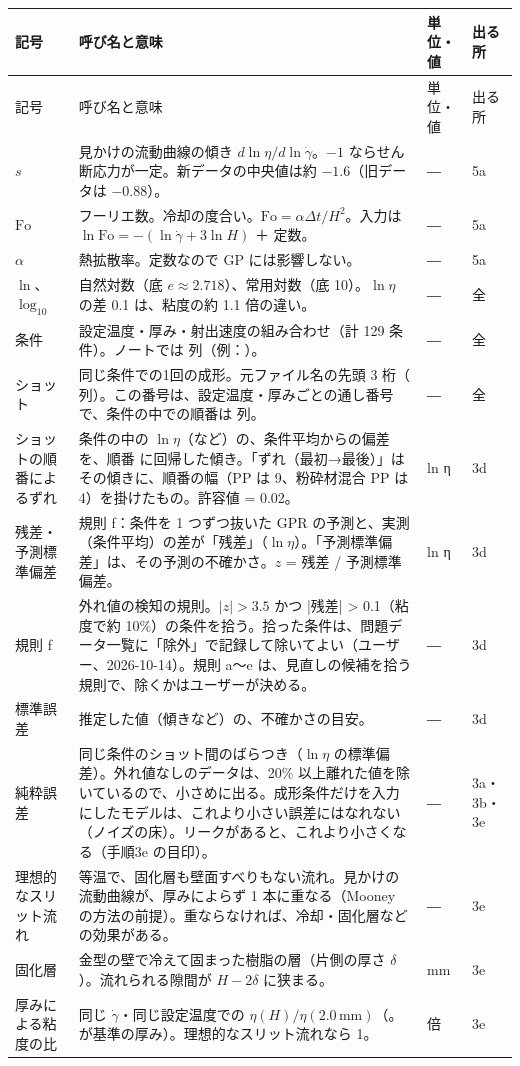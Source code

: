 \documentclass[paper=a4paper,fontsize=10.5pt,line_length=44zw,number_of_lines=38]{jlreq}
\makeatletter
\newcommand{\file}[1]{\texttt{\detokenize{#1}}}
\newcommand{\gd}{\dot{\gamma}}
\newenvironment{symtab}{%
  \begin{longtable}{@{}>{\raggedright\arraybackslash}p{6.5\zw}>{\raggedright\arraybackslash}p{22\zw}>{\raggedright\arraybackslash}p{6\zw}>{\raggedright\arraybackslash}p{4.5\zw}@{}}
  \toprule 記号 & 呼び名と意味 & 単位・値 & 出る所 \\ \midrule \endfirsthead
  \toprule 記号 & 呼び名と意味 & 単位・値 & 出る所 \\ \midrule \endhead
  \bottomrule \endlastfoot}{\end{longtable}}
\makeatother
\begin{document}
\begin{symtab}
$s$ & 見かけの流動曲線の傾き $d\ln\eta/d\ln\gd$。$-1$ ならせん断応力が一定。新データの中央値は約 $-1.6$（旧データは $-0.88$）。 & ― & 5a \\
$\mathrm{Fo}$ & フーリエ数。冷却の度合い。$\mathrm{Fo} = \alpha\Delta t/H^2$。入力は $\ln\mathrm{Fo} = -(\ln\gd + 3\ln H)$ ＋ 定数。 & ― & 5a \\
$\alpha$ & 熱拡散率。定数なので GP には影響しない。 & ― & 5a \\
$\ln$、$\log_{10}$ & 自然対数（底 $e\approx2.718$）、常用対数（底 10）。$\ln\eta$ の差 0.1 は、粘度の約 1.1 倍の違い。 & ― & 全 \\
条件 & 設定温度・厚み・射出速度の組み合わせ（計 129 条件）。ノートでは \file{cond} 列（例：\file{190_0.5_20}）。 & ― & 全 \\
ショット & 同じ条件での1回の成形。元ファイル名の先頭 3 桁（\file{shot} 列）。この番号は、設定温度・厚みごとの通し番号で、条件の中での順番は \file{pos} 列。 & ― & 全 \\
ショットの順番によるずれ & 条件の中の $\ln\eta$（など）の、条件平均からの偏差を、順番 \file{pos} に回帰した傾き。「ずれ（最初→最後）」はその傾きに、順番の幅（PP は 9、粉砕材混合 PP は 4）を掛けたもの。許容値 \file{DRIFT_TOL} = 0.02。 & ln η & 3d \\
残差・予測標準偏差 & 規則 f：条件を 1 つずつ抜いた GPR の予測と、実測（条件平均）の差が「残差」（$\ln\eta$）。「予測標準偏差」は、その予測の不確かさ。$z$ = 残差 / 予測標準偏差。 & ln η & 3d \\
規則 f & 外れ値の検知の規則。$|z|>3.5$ かつ |残差| > 0.1（粘度で約 10\%）の条件を拾う。拾った条件は、問題データ一覧に「除外」で記録して除いてよい（ユーザー、2026-10-14）。規則 a〜e は、見直しの候補を拾う規則で、除くかはユーザーが決める。 & ― & 3d \\
標準誤差 & 推定した値（傾きなど）の、不確かさの目安。 & ― & 3d \\
純粋誤差 & 同じ条件のショット間のばらつき（$\ln\eta$ の標準偏差）。外れ値なしのデータは、20\% 以上離れた値を除いているので、小さめに出る。成形条件だけを入力にしたモデルは、これより小さい誤差にはなれない（ノイズの床）。リークがあると、これより小さくなる（手順3e の目印）。 & ― & 3a・3b・3e \\
理想的なスリット流れ & 等温で、固化層も壁面すべりもない流れ。見かけの流動曲線が、厚みによらず 1 本に重なる（Mooney の方法の前提）。重ならなければ、冷却・固化層などの効果がある。 & ― & 3e \\
固化層 & 金型の壁で冷えて固まった樹脂の層（片側の厚さ $\delta$）。流れられる隙間が $H - 2\delta$ に狭まる。 & mm & 3e \\
厚みによる粘度の比 & 同じ $\gd$・同じ設定温度での $\eta(H)/\eta(2.0\,\mathrm{mm})$（\file{thickness_ratio.csv}。\file{REF_H} が基準の厚み）。理想的なスリット流れなら 1。 & 倍 & 3e \\
\end{symtab}
\end{document}
